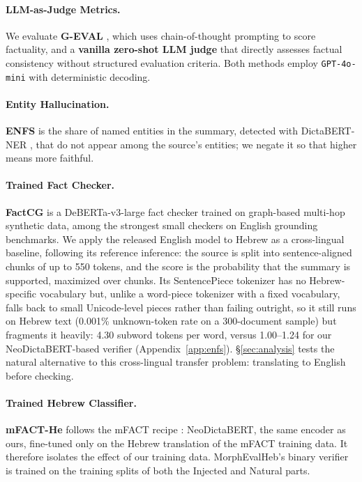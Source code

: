 \documentclass[11pt]{article}
\begin{document}
\paragraph{LLM-as-Judge Metrics.}
We evaluate \textbf{G-EVAL} \cite{liu-etal-2023-g}, which uses chain-of-thought prompting to score factuality, and a \textbf{vanilla zero-shot LLM judge} that directly assesses factual consistency without structured evaluation criteria. Both methods employ \texttt{GPT-4o-mini} with deterministic decoding.

\paragraph{Entity Hallucination.}
\textbf{ENFS} \citep{cao-etal-2022-hallucinated} is the share of named entities in the summary, detected with DictaBERT-NER \citep{shmidman2023dictabert}, that do not appear among the source's entities; we negate it so that higher means more faithful.

\paragraph{Trained Fact Checker.}
\textbf{FactCG} \citep{lei-etal-2025-factcg} is a DeBERTa-v3-large fact checker trained on graph-based multi-hop synthetic data, among the strongest small checkers on English grounding benchmarks. We apply the released English model to Hebrew as a cross-lingual baseline, following its reference inference: the source is split into sentence-aligned chunks of up to 550 tokens, and the score is the probability that the summary is supported, maximized over chunks. Its SentencePiece tokenizer has no Hebrew-specific vocabulary but, unlike a word-piece tokenizer with a fixed vocabulary, falls back to small Unicode-level pieces rather than failing outright, so it still runs on Hebrew text (0.001\% unknown-token rate on a 300-document sample) but fragments it heavily: 4.30 subword tokens per word, versus 1.00--1.24 for our NeoDictaBERT-based verifier (Appendix~\ref{app:enfs}). \S\ref{sec:analysis} tests the natural alternative to this cross-lingual transfer problem: translating to English before checking.

\paragraph{Trained Hebrew Classifier.}
\textbf{mFACT-He} follows the mFACT recipe \citep{qiu2023detecting}: NeoDictaBERT, the same encoder as ours, fine-tuned only on the Hebrew translation of the mFACT training data. It therefore isolates the effect of our training data. MorphEvalHeb's binary verifier is trained on the training splits of both the Injected and Natural parts.
\end{document}
